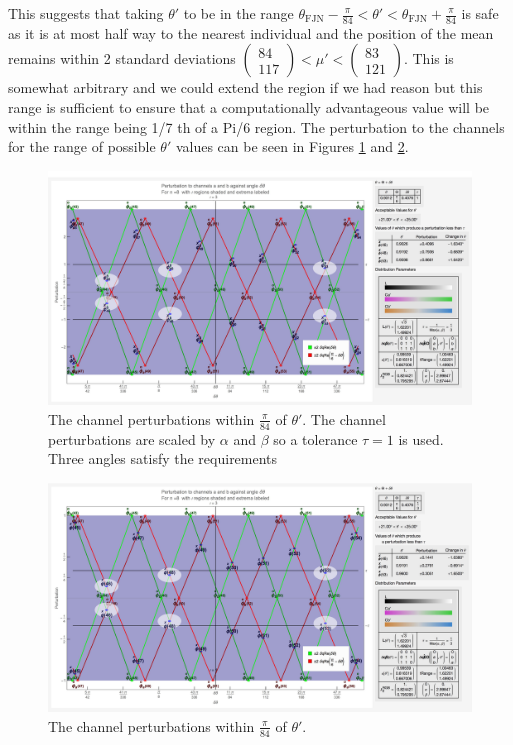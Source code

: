 This suggests that taking $\theta'$ to be in the range $\theta _{\text{FJN}} -\frac{\pi}{84} < \theta' < \theta _{\text{FJN}} +\frac{\pi}{84}$ is safe as it is at most half way to the nearest individual and the position of the mean remains within 2 standard deviations 
$\left(\begin{array}{c} 84 \\ 117 \end{array} \right) < \mu'  < \left(\begin{array}{c} 83 \\ 121 \end{array} \right) $. This is somewhat arbitrary and we could extend the region if we had reason but this range is sufficient to ensure that a computationally advantageous value will be within the range being 1/7 th of a Pi/6 region.  The perturbation to the channels for the range of possible $\theta'$ values can be seen in Figures \ref{fig:PerturbationNearThetaAB} and \ref{fig:PerturbationNearThetaT}.


\begin{figure}[h!]
  \centering
  \includegraphics[width=1.0 \textwidth]{Chapter3/Figs/Channel_Perturbations_Angle_Decision_AB.jpg} 
    \caption{The channel perturbations within $\frac{\pi}{84}$ of $\theta'$. The channel perturbations are scaled by $\alpha$ and $\beta$ so a tolerance $\tau=1$ is used. Three angles satisfy the requirements}  \label{fig:PerturbationNearThetaAB}
\end{figure}

\begin{figure}[h!]
  \centering
  \includegraphics[width=1.0 \textwidth]{Chapter3/Figs/Channel_Perturbations_Angle_Decision_T.jpg} 
    \caption{The channel perturbations within $\frac{\pi}{84}$ of $\theta'$.}  \label{fig:PerturbationNearThetaT}
\end{figure}

